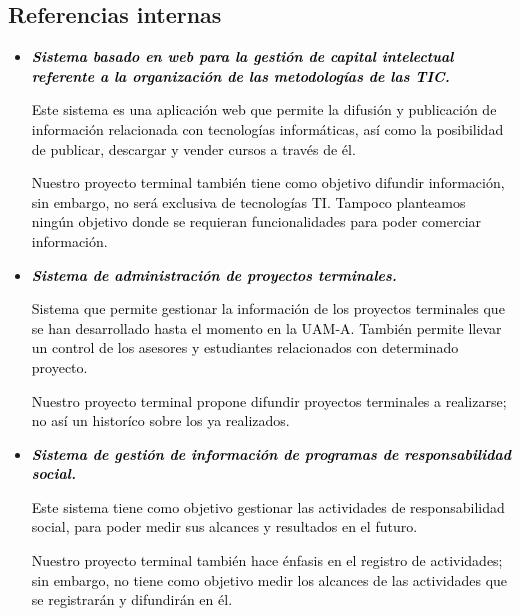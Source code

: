 \documentclass[11pt,letterpaper,titlepage]{article}
\begin{document}
\subsection{Referencias internas}

\begin{itemize}

  \item \textcolor{black}{\textit{\textbf{Sistema basado en web para la gesti\'on de capital intelectual referente a la organizaci\'on de las metodolog\'ias de las TIC.}}}

\textcolor{black}{Este sistema es una aplicaci\'on web que permite la difusi\'on y publicaci\'on de informaci\'on relacionada con tecnolog\'ias inform\'aticas, as\'i como la posibilidad de publicar, descargar y vender cursos a trav\'es de \'el.}

\textcolor{black}{Nuestro proyecto terminal tambi\'en tiene como objetivo difundir informaci\'on, sin embargo, no ser\'a exclusiva de tecnolog\'ias TI. Tampoco planteamos ning\'un objetivo donde se requieran funcionalidades para poder comerciar informaci\'on.}

  \item \textcolor{black}{\textit{\textbf{Sistema de administraci\'on de proyectos terminales.}}}

\textcolor{black}{Sistema que permite gestionar la informaci\'on de los proyectos terminales que se han desarrollado hasta el momento en la UAM-A. Tambi\'en permite llevar un control de los asesores y estudiantes relacionados con determinado proyecto.}

\textcolor{black}{Nuestro proyecto terminal propone difundir proyectos terminales a realizarse; no as\'i un histor\'ico sobre los ya realizados.}

  \item \textcolor{black}{\textit{\textbf{Sistema de gesti\'on de información de programas de responsabilidad social.}}}

\textcolor{black}{Este sistema tiene como objetivo gestionar las actividades de responsabilidad social, para poder medir sus alcances y resultados en el futuro.}

\textcolor{black}{Nuestro proyecto terminal tambi\'en hace \'enfasis en el registro de actividades; sin embargo, no tiene como objetivo medir los alcances de las actividades que se registrar\'an y difundir\'an en \'el.}

\end{itemize}
\end{document}
